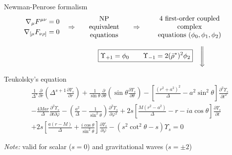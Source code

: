 \documentclass[9pt]{beamer}
\newcommand{\xDownarrow}[1]{%
	{\left\Downarrow\vbox to #1{}\right.\kern-\nulldelimiterspace}
}
\begin{document}
\begin{frame}[fragile]{Newman-Penrose formalism}
	\begin{equation*}
		\begin{aligned}
			\nabla_\mu F^{\mu\nu} = 0 \\
			\nabla_{[\mu} F_{\nu\rho]} = 0
		\end{aligned}
		\quad\Rightarrow\quad
		\parbox{2.1cm}{\centering NP equivalent\\equations }
		\quad\Rightarrow\quad
		\parbox{4.2cm}{\centering 4 first-order coupled complex\\equations $(\phi_0, \phi_1, \phi_2)$ }
	\end{equation*}

	\begin{equation*}
	 	\hspace*{2.5cm}\scriptstyle\boxed{\Upsilon_{+1} = \phi_0 \qquad \Upsilon_{-1} = 2 (\bar{\rho}^*)^2 \phi_2 }\quad\xDownarrow{0.6cm} 
	\end{equation*}
	\begin{block}{Teukolsky's equation}
		\begin{align*}
		& \frac{1}{\Delta^s} \frac{\partial}{\partial r} \left( \Delta^{s+1} \frac{\partial \Upsilon_s}{\partial r} \right) 
		+ \frac{1}{\sin\theta} \frac{\partial}{\partial\theta} \left( \sin\theta \frac{\partial \Upsilon_s}{\partial \theta} \right) 
		- \left[ \frac{(r^2+a^2)^2}{\Delta} - a^2 \sin^2\theta \right]\frac{\partial^2 \Upsilon_s}{\partial t^2} \\[0.15cm]
		& - \frac{4 M a r}{\Delta}\frac{\partial^2 \Upsilon_s}{\partial t \partial \varphi} 
		- \left( \frac{a^2}{\Delta} -\frac{1}{\sin^2\theta} \right)\frac{\partial^2 \Upsilon_s}{\partial \varphi^2} 
		+ 2s\left[ \frac{M(r^2-a^2)}{\Delta} - r - i a \cos\theta \right] \frac{\partial \Upsilon_s}{\partial t} \\[0.15cm]
		&+ 2s\left[ \frac{a(r-M)}{\Delta}+\frac{i \cos\theta}{\sin^2\theta}\right] \frac{\partial \Upsilon_s}{\partial \varphi}
		- (s^2 \cot^2\theta - s) \Upsilon_s = 0 
		\end{align*}
	\end{block}

	\emph{Note:} valid for scalar ($s=0$) and gravitational waves ($s=\pm 2$)  
	
\end{frame}
\end{document}
